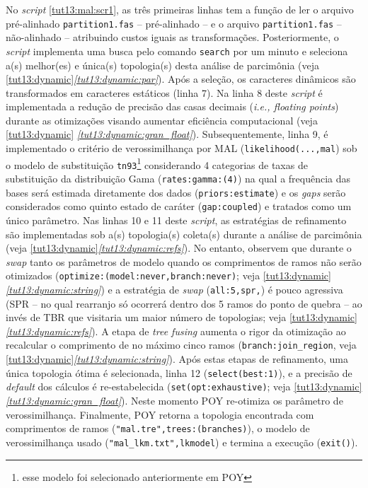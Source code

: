 \begin{refsection}
No \textit{script} \ref{tut13:mal:scr1}, as três primeiras linhas tem a função de ler o arquivo pré-alinhado \texttt{partition1.fas} -- pré-alinhado -- e o arquivo \texttt{partition1.fas} -- não-alinhado -- atribuindo custos iguais as transformações. Posteriormente, o \textit{script} implementa uma busca pelo comando \texttt{search} por um minuto e seleciona a(s) melhor(es) e única(s) topologia(s) desta análise de parcimônia (veja \ref{tut13:dynamic}\textit{\ref{tut13:dynamic:par}}). Após a seleção, os caracteres dinâmicos são transformados em caracteres estáticos (linha 7). Na linha 8 deste \textit{script} é implementada a redução de precisão das casas decimais (\textit{i.e., floating points}) durante as otimizações visando aumentar eficiência computacional (veja \ref{tut13:dynamic} \textit{\ref{tut13:dynamic:gran_float}}). Subsequentemente, linha 9, é implementado o critério de verossimilhança por MAL (\texttt{likelihood(...,mal}) sob o modelo de substituição \texttt{tn93}\footnote{esse modelo foi selecionado anteriormente em POY} considerando 4 categorias de taxas de substituição da distribuição Gama (\texttt{rates:gamma:(4)}) na qual a frequência das bases será estimada diretamente dos dados (\texttt{priors:estimate}) e os \textit{gaps} serão considerados como quinto estado de caráter (\texttt{gap:coupled}) e tratados como um único parâmetro. Nas linhas 10 e 11 deste \textit{script}, as estratégias de refinamento são implementadas sob a(s) topologia(s) coleta(s) durante a análise de parcimônia (veja \ref{tut13:dynamic}\textit{\ref{tut13:dynamic:refs}}). No entanto, observem que durante o \textit{swap} tanto os parâmetros de modelo quando os comprimentos de ramos não serão otimizados (\texttt{optimize:(model:never,branch:never)}; veja \ref{tut13:dynamic}\textit{\ref{tut13:dynamic:string}}) e a estratégia de \textit{swap} (\texttt{all:5,spr,}) é pouco agressiva (SPR -- no qual rearranjo só ocorrerá dentro dos 5 ramos do ponto de quebra -- ao invés de TBR que visitaria um maior número de topologias; veja \ref{tut13:dynamic}\textit{\ref{tut13:dynamic:refs}}). A etapa de \textit{tree fusing} aumenta o rigor da otimização ao recalcular o comprimento de no máximo cinco ramos (\texttt{branch:join\_region}, veja \ref{tut13:dynamic}\textit{\ref{tut13:dynamic:string}}). Após estas etapas de refinamento, uma única topologia ótima é selecionada, linha 12 (\texttt{select(best:1)}), e a precisão de \textit{default} dos cálculos é re-estabelecida (\texttt{set(opt:exhaustive)}; veja \ref{tut13:dynamic}\textit{\ref{tut13:dynamic:gran_float}}). Neste momento POY re-otimiza os parâmetro de verossimilhança. Finalmente, POY retorna a topologia encontrada com comprimentos de ramos (\texttt{"mal.tre",trees:(branches)}), o modelo de verossimilhança usado (\texttt{"mal\_lkm.txt",lkmodel}) e termina a execução (\texttt{exit()}).\\



\end{refsection}
